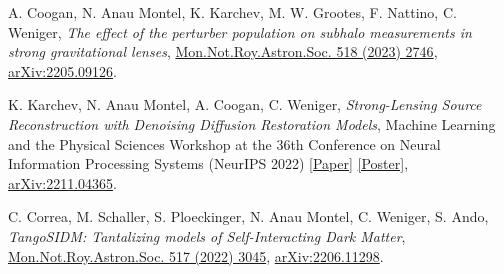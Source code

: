 \begin{itemize}[]

{\selectfont

 \item[\cite{Coogan:2022cky}] 
A. Coogan, {N. Anau Montel}, K. Karchev,  M. W. Grootes, F. Nattino, C. Weniger, \textit{The effect of the perturber population on subhalo measurements in strong gravitational lenses}, \href{https://doi.org/10.1093/mnras/stac3215}{Mon.Not.Roy.Astron.Soc. 518 (2023) 2746}, \href{https://arxiv.org/abs/2205.09126}{\ttfamily arXiv:2205.09126}.  \vskip 5pt

\item[\cite{Karchev:2022aa}] 
K. Karchev, {N. Anau Montel}, A. Coogan, C. Weniger, \textit{Strong-Lensing Source Reconstruction with Denoising Diffusion Restoration Models}, Machine Learning and the Physical Sciences Workshop at the 36th Conference on Neural Information Processing Systems (NeurIPS 2022) \href{https://ml4physicalsciences.github.io/2022/files/NeurIPS_ML4PS_2022_169.pdf}{[Paper]} \href{https://neurips.cc/media/PosterPDFs/NeurIPS%202022/56913.png}{[Poster]}, \href{https://arxiv.org/abs/2211.04365}{\ttfamily arXiv:2211.04365}. \vskip 5pt

\item[\cite{Correa:2022aa}] 
C. Correa, M. Schaller, S. Ploeckinger, {N. Anau Montel}, C. Weniger, S. Ando, \textit{TangoSIDM: Tantalizing models of Self-Interacting Dark Matter}, \href{https://doi.org/10.1093/mnras/stac2830}{Mon.Not.Roy.Astron.Soc. 517 (2022) 3045}, \href{https://arxiv.org/abs/2206.11298}{\ttfamily arXiv:2206.11298}. \vskip 5pt



}

\end{itemize}


\newpage

